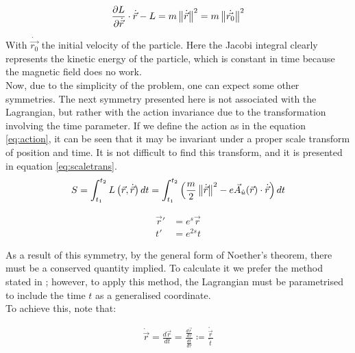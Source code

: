 \begin{equation*}
 \frac{\partial L}{\partial\dot{\vec{r}}}\cdot\dot{\vec{r}} - L = m\left\lVert \dot{\vec{r}} \right\rVert^2                    =m\left\lVert \dot{\vec{r_0}} \right\rVert^2 
\end{equation*}

With $\dot{\vec{r_0}}$ the initial velocity of the particle. Here the Jacobi integral clearly represents the kinetic energy of the particle, which is constant in time because the magnetic field does no work.\\

Now, due to the simplicity of the problem, one can expect some other symmetries. The next symmetry presented here is not associated with the Lagrangian, but rather with the action invariance due to the transformation involving the time parameter. If we define the action as in the equation \eqref{eq:action}, it can be seen that it may be invariant under a proper scale transform of position and time. It is not difficult to find this transform, and it is presented in equation \eqref{eq:scaletrans}.\\

\begin{equation}
S = \int_{t_1}^{t_2}L\left( \vec{r},\dot{\vec{r}} \right)dt = \int_{t_1}^{t_2}\left( \frac{m}{2}\left\lVert \dot{\vec{r}} \right\rVert^2 - e\vec{A}_{\hat{u}}(\vec{r})\cdot\dot{\vec{r}} \right)dt 
\label{eq:action}
\end{equation}

\begin{equation}
\begin{aligned}
\vec{r}' &= e^{s}\vec{r}\\
t'&= e^{2s}t
\end{aligned}
\label{eq:scaletrans}
\end{equation}

As a result of this symmetry, by the general form of Noether's theorem, there must be a conserved quantity implied. To calculate it we prefer the method stated in \cite[2.19 Noether's Thm]{scheck}; however, to apply this method, the Lagrangian must be parametrised to include the time $t$ as a generalised coordinate.\\

To achieve this, note that:

\begin{align*}
\dot{\vec{r}} = \frac{d\vec{r}}{dt} = \frac{\frac{d\vec{r}}{d\tau}}{\frac{dt}{d\tau}} \coloneqq \frac{\mathring{\vec{r}}}{\mathring{t}}
\end{align*}

